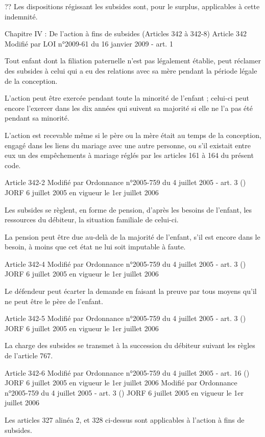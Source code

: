 \documentclass[
  12pt,
]{book}
\begin{document}
\begin{encadre}{??}
Les dispositions régissant les subsides sont, pour le surplus, applicables à cette indemnité.

Chapitre IV : De l'action à fins de subsides (Articles 342 à 342-8)
Article 342
Modifié par LOI n°2009-61 du 16 janvier 2009 - art. 1

Tout enfant dont la filiation paternelle n'est pas légalement établie, peut réclamer des subsides à celui qui a eu des relations avec sa mère pendant la période légale de la conception.

L'action peut être exercée pendant toute la minorité de l'enfant ; celui-ci peut encore l'exercer dans les dix années qui suivent sa majorité si elle ne l'a pas été pendant sa minorité.

L'action est recevable même si le père ou la mère était au temps de la conception, engagé dans les liens du mariage avec une autre personne, ou s'il existait entre eux un des empêchements à mariage réglés par les articles 161 à 164 du présent code.

Article 342-2
Modifié par Ordonnance n°2005-759 du 4 juillet 2005 - art. 3 () JORF 6 juillet 2005 en vigueur le 1er juillet 2006

Les subsides se règlent, en forme de pension, d'après les besoins de l'enfant, les ressources du débiteur, la situation familiale de celui-ci.

La pension peut être due au-delà de la majorité de l'enfant, s'il est encore dans le besoin, à moins que cet état ne lui soit imputable à faute.

Article 342-4
Modifié par Ordonnance n°2005-759 du 4 juillet 2005 - art. 3 () JORF 6 juillet 2005 en vigueur le 1er juillet 2006

Le défendeur peut écarter la demande en faisant la preuve par tous moyens qu'il ne peut être le père de l'enfant.

Article 342-5
Modifié par Ordonnance n°2005-759 du 4 juillet 2005 - art. 3 () JORF 6 juillet 2005 en vigueur le 1er juillet 2006

La charge des subsides se transmet à la succession du débiteur suivant les règles de l'article 767.

Article 342-6
Modifié par Ordonnance n°2005-759 du 4 juillet 2005 - art. 16 () JORF 6 juillet 2005 en vigueur le 1er juillet 2006
Modifié par Ordonnance n°2005-759 du 4 juillet 2005 - art. 3 () JORF 6 juillet 2005 en vigueur le 1er juillet 2006

Les articles 327 alinéa 2, et 328 ci-dessus sont applicables à l'action à fins de subsides.


\end{encadre}
\end{document}
